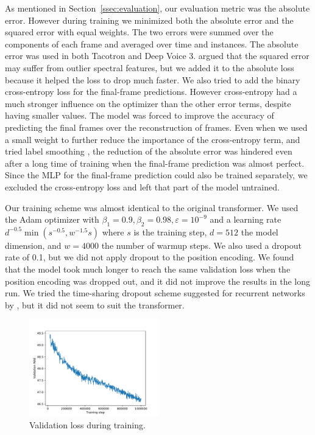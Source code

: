\documentclass[11pt]{article}
\begin{document}
As mentioned in Section~\ref{ssec:evaluation},
our evaluation metric was the absolute error.
However during training we minimized both the absolute error and the squared error with equal weights.
The two errors were summed over the components of each frame and averaged over time and instances.
The absolute error was used in both Tacotron and Deep Voice 3.
\textcite{ping2017deep} argued that the squared error may suffer from outlier spectral features,
but we added it to the absolute loss because it helped the loss to drop much faster.
We also tried to add the binary cross-entropy loss for the final-frame predictions.
However cross-entropy had a much stronger influence on the optimizer
than the other error terms, despite having smaller values.
The model was forced to improve the accuracy of predicting the final frames
over the reconstruction of frames.
Even when we used a small weight to further reduce the importance of the cross-entropy term,
and tried label smoothing \parencite{szegedy2016rethinking},
the reduction of the absolute error was hindered even after a long time of training
when the final-frame prediction was almost perfect.
Since the MLP for the final-frame prediction could also be trained separately,
we excluded the cross-entropy loss and left that part of the model untrained.

Our training scheme was almost identical to the original transformer.
We used the Adam optimizer \parencite{kingma2014adam} with
\(\beta_{1} = 0.9, \beta_{2} = 0.98, \varepsilon = 10^{-9}\)
and a learning rate
\(d^{-0.5} \min \left(s^{-0.5}, w^{-1.5}s\right)\)
where \(s\) is the training step,
\(d = 512\) the model dimension,
and \(w = 4000\) the number of warmup steps.
We also used a dropout rate of 0.1,
but we did not apply dropout to the position encoding.
We found that the model took much longer to reach the same validation loss
when the position encoding was dropped out,
and it did not improve the results in the long run.
We tried the time-sharing dropout scheme suggested for recurrent networks
by \textcite{gal2016theoretically},
but it did not seem to suit the transformer.

\begin{figure}
\centering
\includegraphics[width=0.5\textwidth]{image/loss.pdf}
\caption{\label{fig:loss}Validation loss during training.}
\end{figure}
\end{document}
